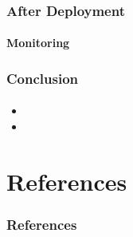 \documentclass{beamer}
\begin{document}
\begin{frame}
	\frametitle{After Deployment}
	\framesubtitle{Monitoring}
\end{frame}

\begin{frame}
	\frametitle{Conclusion}
	\framesubtitle{}
	\begin{itemize}
		\item 
		\item 
	\end{itemize}
\end{frame}

\section{References}
\begin{frame}
	\frametitle{References}
	\framesubtitle{}

        \nocite{newman,cohn,infosys,clemson,fowler_cont_del,naik}
	
\end{frame}

\end{document}
